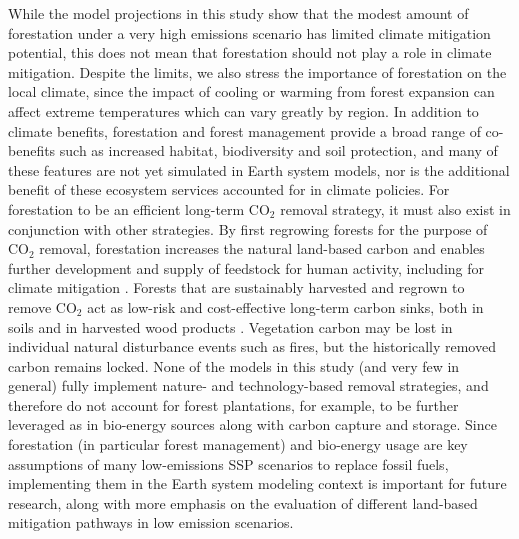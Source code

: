 \documentclass[draft]{agujournal2019}
\begin{document}
While the model projections in this study show that the modest amount of forestation under a very high emissions scenario has limited climate mitigation potential, this does not mean that forestation should not play a role in climate mitigation.
Despite the limits, we also stress the importance of forestation on the local climate, since the impact of cooling or warming from forest expansion can affect extreme temperatures which can vary greatly by region.
In addition to climate benefits, forestation and forest management provide a broad range of co-benefits such as increased habitat, biodiversity and soil protection, and many of these features are not yet simulated in Earth system models, nor is the additional benefit of these ecosystem services accounted for in climate policies.
For forestation to be an efficient long-term CO$_2$ removal strategy, it must also exist in conjunction with other strategies.
By first regrowing forests for the purpose of CO$_2$ removal, forestation increases the natural land-based carbon and enables further development and supply of feedstock for human activity, including for climate mitigation \cite{geng_review_2017}.
Forests that are sustainably harvested and regrown to remove CO$_2$ act as low-risk and cost-effective long-term carbon sinks, both in soils and in harvested wood products \cite{schulze_climate_2020,soimakallio_trade-offs_2021}.
Vegetation carbon may be lost in individual natural disturbance events such as fires, but the historically removed carbon remains locked.
None of the models in this study (and very few in general) fully implement nature- and technology-based removal strategies, and therefore do not account for forest plantations, for example, to be further leveraged as in bio-energy sources along with carbon capture and storage.
Since forestation (in particular forest management) and bio-energy usage are key assumptions of many low-emissions SSP scenarios to replace fossil fuels, implementing them in the Earth system modeling context is important for future research, along with more emphasis on the evaluation of different land-based mitigation pathways in low emission scenarios.


%
%
%
%
\end{document}
